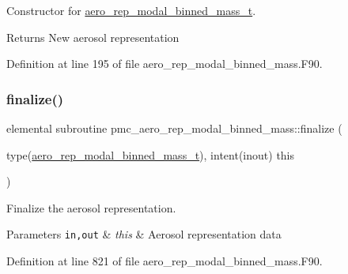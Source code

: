 Constructor for \mbox{\hyperlink{structpmc__aero__rep__modal__binned__mass_1_1aero__rep__modal__binned__mass__t}{aero\+\_\+rep\+\_\+modal\+\_\+binned\+\_\+mass\+\_\+t}}. 

\begin{DoxyReturn}{Returns}
New aerosol representation 
\end{DoxyReturn}


Definition at line 195 of file aero\+\_\+rep\+\_\+modal\+\_\+binned\+\_\+mass.\+F90.

\mbox{\label{namespacepmc__aero__rep__modal__binned__mass_ad6cd49efed6d2028c66061b1faa76ff7}} 
\subsubsection{\texorpdfstring{finalize()}{finalize()}}
{\footnotesize\ttfamily elemental subroutine pmc\+\_\+aero\+\_\+rep\+\_\+modal\+\_\+binned\+\_\+mass\+::finalize (\begin{DoxyParamCaption}\item[{type(\mbox{\hyperlink{structpmc__aero__rep__modal__binned__mass_1_1aero__rep__modal__binned__mass__t}{aero\+\_\+rep\+\_\+modal\+\_\+binned\+\_\+mass\+\_\+t}}), intent(inout)}]{this }\end{DoxyParamCaption})\hspace{0.3cm}{\ttfamily [private]}}



Finalize the aerosol representation. 


\begin{DoxyParams}[1]{Parameters}
\mbox{\tt in,out}  & {\em this} & Aerosol representation data \\
\hline
\end{DoxyParams}


Definition at line 821 of file aero\+\_\+rep\+\_\+modal\+\_\+binned\+\_\+mass.\+F90.

\mbox{\label{namespacepmc__aero__rep__modal__binned__mass_a2d6f17a8b9f3c6748a16f97d034bc9d1}} 
